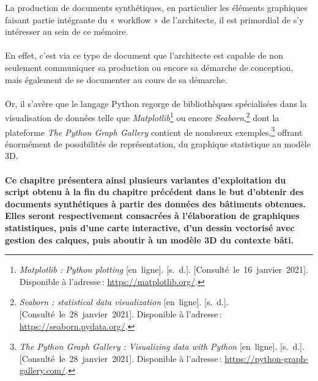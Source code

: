 \documentclass[
  11pt,
  french,
]{article}
\begin{document}
La production de documents synthétiques, en particulier les éléments
graphiques faisant partie intégrante du « workflow » de l'architecte, il
est primordial de s'y intéresser au sein de ce mémoire.\\
~\\
En effet, c'est via ce type de document que l'architecte est capable de
non seulement communiquer sa production ou encore sa démarche de
conception, mais également de se documenter au cours de sa démarche.\\
~\\
Or, il s'avère que le langage Python regorge de bibliothèques
spécialisées dans la visualisation de données telle que
\emph{Matplotlib}\footnote{\emph{Matplotlib : Python plotting}
  {[}en~ligne{]}. {[}s.~d.{]}. {[}Consulté~le~16~janvier~2021{]}.
  Disponible à l'adresse\,: \url{https://matplotlib.org/}.} ou encore
\emph{Seaborn},\footnote{\emph{Seaborn : statistical data visualization}
  {[}en~ligne{]}. {[}s.~d.{]}. {[}Consulté~le~28~janvier~2021{]}.
  Disponible à l'adresse\,: \url{https://seaborn.pydata.org/}.} dont la
plateforme \emph{The Python Graph Gallery} contient de nombreux
exemples,\footnote{\emph{The Python Graph Gallery : Visualizing data
  with Python} {[}en~ligne{]}. {[}s.~d.{]}.
  {[}Consulté~le~28~janvier~2021{]}. Disponible à l'adresse\,:
  \url{https://python-graph-gallery.com/}.} offrant énormément de
possibilités de représentation, du graphique statistique au modèle 3D.\\
~\\
\textbf{Ce chapitre présentera ainsi plusieurs variantes d'exploitation
du script obtenu à la fin du chapitre précédent dans le but d'obtenir
des documents synthétiques à partir des données des bâtiments obtenues.
Elles seront respectivement consacrées à l'élaboration de graphiques
statistiques, puis d'une carte interactive, d'un dessin vectorisé avec
gestion des calques, puis aboutir à un modèle 3D du contexte bâti.}
\end{document}
